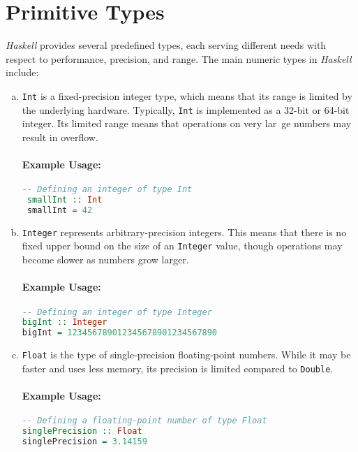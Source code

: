 \section{Primitive Types}
\textsl{Haskell} provides several predefined types, each serving different needs with respect to performance, precision,
and range. The main numeric types in \textsl{Haskell} include: 
\begin{enumerate}[(a)]
\item \texttt{Int} is a fixed-precision integer type, which means that its range is limited by the underlying
      hardware. Typically, \texttt{Int} is implemented as a 32-bit or 64-bit integer. Its limited range means that
      operations on very lar~ge numbers may result in overflow. 

      \paragraph{Example Usage:}
      \begin{lstlisting}[style=haskellstyle, language=Haskell]
 -- Defining an integer of type Int
 smallInt :: Int
 smallInt = 42
      \end{lstlisting}

\item \texttt{Integer} represents arbitrary-precision integers. This means that there is no fixed upper bound
      on the size of an \texttt{Integer} value, though operations may become slower as numbers grow larger. 

\paragraph{Example Usage:}
\begin{lstlisting}[style=haskellstyle, language=Haskell]
-- Defining an integer of type Integer
bigInt :: Integer
bigInt = 123456789012345678901234567890
\end{lstlisting}

\item \texttt{Float} is the type of single-precision floating-point numbers. While it may be faster and uses less
      memory, its precision is limited compared to \texttt{Double}. 

\paragraph{Example Usage:}
\begin{lstlisting}[style=haskellstyle, language=Haskell]
-- Defining a floating-point number of type Float
singlePrecision :: Float
singlePrecision = 3.14159
\end{lstlisting}


\end{enumerate}
